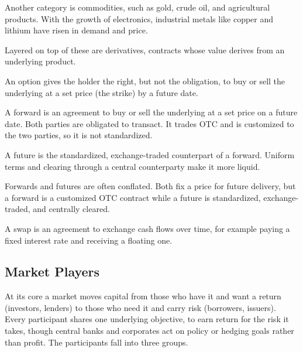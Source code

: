 Another category is commodities, such as gold, crude oil, and agricultural products. With the growth of electronics, industrial metals like copper and lithium have risen in demand and price.

Layered on top of these are derivatives, contracts whose value derives from an underlying product.

\begin{definition}[Option]
An option gives the holder the right, but not the obligation, to buy or sell the underlying at a set price (the strike) by a future date.
\end{definition}

\begin{definition}[Forward]
A forward is an agreement to buy or sell the underlying at a set price on a future date. Both parties are obligated to transact. It trades OTC and is customized to the two parties, so it is not standardized.
\end{definition}

\begin{definition}[Future]
A future is the standardized, exchange-traded counterpart of a forward. Uniform terms and clearing through a central counterparty make it more liquid.
\end{definition}

\begin{remark}
Forwards and futures are often conflated. Both fix a price for future delivery, but a forward is a customized OTC contract while a future is standardized, exchange-traded, and centrally cleared.
\end{remark}

\begin{definition}[Swap]
A swap is an agreement to exchange cash flows over time, for example paying a fixed interest rate and receiving a floating one.
\end{definition}

\bigskip

\subsection{Market Players}

At its core a market moves capital from those who have it and want a return (investors, lenders) to those who need it and carry risk (borrowers, issuers). Every participant shares one underlying objective, to earn return for the risk it takes, though central banks and corporates act on policy or hedging goals rather than profit. The participants fall into three groups.

